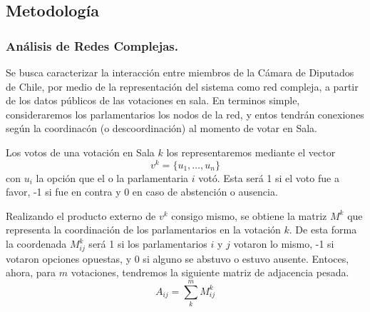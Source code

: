 \documentclass{proyectotesis}
\begin{document}
\subsection{Metodología}
\subsubsection{Análisis de Redes Complejas.}
Se busca caracterizar la interacción entre miembros de la Cámara de Diputados de Chile, por medio de la representación del sistema como red compleja, a partir de los datos públicos de las votaciones en sala. En terminos simple, consideraremos los parlamentarios los nodos de la red, y entos tendrán conexiones según la coordinacón (o descoordinación) al momento de votar en Sala.

Los votos de una votación en Sala $k$ los representaremos mediante el vector 
\begin{equation}
    v^k = \{u_1,\dots,u_n\}
\end{equation}
con $u_i$ la opción que el o la parlamentaria $i$ votó. Esta será 1 si el voto fue a favor, -1 si fue en contra y 0 en caso de abstención o ausencia.

Realizando el producto externo de $v^k$ consigo mismo, se obtiene la matriz $M^k$ que representa la coordinación de los parlamentarios en la votación $k$. De esta forma la coordenada $M^k_{ij}$ será 1 si los parlamentarios $i$ y $j$ votaron lo mismo, -1 si votaron opciones opuestas, y 0 si alguno se abstuvo o estuvo ausente. Entoces, ahora, para $m$ votaciones, tendremos la siguiente matriz de adjacencia pesada.
\begin{equation}
    A_{ij} = \sum_k^m M^k_{ij} \label{adj}
\end{equation}


%
%
\end{document}
